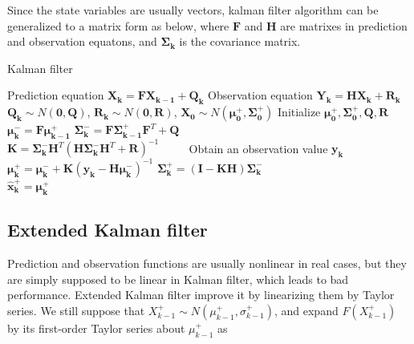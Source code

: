 \documentclass[conference]{IEEEtran}
\begin{document}
	Since the state variables are usually vectors, kalman filter algorithm can be generalized to a matrix form as below, where $\boldsymbol{F}$ and $\boldsymbol{H}$ are matrixes in prediction and observation equatons, and $\boldsymbol{\Sigma _{k}}$ is the covariance matrix.
	
	\begin{algorithm}
		\caption{Kalman filter}
		\begin{algorithmic}  
			\STATE Prediction equation $\boldsymbol{X_{k}}=\boldsymbol{F}\boldsymbol{X_{k-1}}+\boldsymbol{Q_{k}}$
			\STATE Observation equation $\boldsymbol{Y_{k}}=\boldsymbol{H}\boldsymbol{X_{k}}+\boldsymbol{R_{k}}$
			\STATE $\boldsymbol{Q_{k}}\sim N(\boldsymbol{0},\boldsymbol{Q})$, $\boldsymbol{R_{k}}\sim N(\boldsymbol{0},\boldsymbol{R})$, $\boldsymbol{X_{0}}\sim N(\boldsymbol{\mu_{0}^{+}}, \boldsymbol{\Sigma_{0}^{+}})$
			\STATE Initialize $ \boldsymbol{\mu_{0}^{+}}, \boldsymbol{\Sigma_{0}^{+}}, \boldsymbol{Q}, \boldsymbol{R}$
			\STATE $\boldsymbol{\mu_{k}^{-}}=\boldsymbol{F}\boldsymbol{\mu_{k-1}^{+}}$ 
			\STATE $\boldsymbol{\Sigma_{k}^{-}}=\boldsymbol{F}\boldsymbol{\Sigma_{k-1}^{+}}\boldsymbol{F}^{T}+\boldsymbol{Q}$ \ \ \ \ \ \ \ \ \ \ \ \ \ \ \ \ \ \ \ \ 
			\STATE $\boldsymbol{K}=\boldsymbol{\Sigma_{k}^{-}}\boldsymbol{H}^{T}(\boldsymbol{H}\boldsymbol{\Sigma_{k}^{-}}\boldsymbol{H}^{T}+\boldsymbol{R})^{-1}$ \ \ \ \ 	
			\STATE Obtain an observation value $\boldsymbol{y_{k}}$
			\STATE $\boldsymbol{\mu_{k}^{+}}=\boldsymbol{\mu_{k}^{-}}+\boldsymbol{K}(\boldsymbol{y_{k}}-\boldsymbol{H}\boldsymbol{\mu_{k}^{-}})^{-1}$
			\STATE $\boldsymbol{\Sigma_{k}^{+}}=(\boldsymbol{I}-\boldsymbol{KH})\boldsymbol{\Sigma_{k}^{-}}$ \ \ \ \ \ \ \ \ \ \ \ \ \ \ \ \ \ \ \ \ \ \ \ 
			\STATE $\boldsymbol{\hat{x}_{k}^{+}}=\boldsymbol{\mu_{k}^{+}}$
			\ENDFOR
		\end{algorithmic}
	\end{algorithm}
	
	\subsection{Extended Kalman filter}
	
	Prediction and observation functions are usually nonlinear in real cases, but they are simply supposed to be linear in Kalman filter, which leads to bad performance. Extended Kalman filter improve it by linearizing them by Taylor series. We still suppose that $X_{k-1}^{+}\sim N(\mu_{k-1}^{+}, \sigma_{k-1}^{+})$, and expand $F(X_{k-1}^{+})$ by its first-order Taylor series about $\mu_{k-1}^{+}$ as
	
\end{document}

